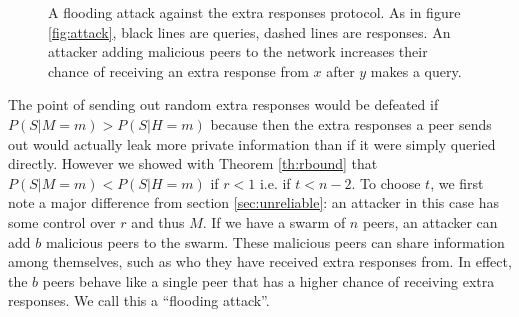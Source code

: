 \documentclass{article}
\newcommand{\secref}[1]{section \ref{sec:#1}}
\newcommand{\thref}[1]{Theorem \ref{th:#1}}
\newcommand{\figref}[1]{figure \ref{fig:#1}}
\begin{document}
\begin{figure}
	\centering
	\caption{A flooding attack against the extra responses protocol. As in \figref{attack},
	black lines are queries, dashed lines are responses. An attacker
	adding malicious peers to the network increases their chance of receiving an
	extra response from $x$ after $y$ makes a query.}
	\label{fig:flood}
\end{figure}

The point of sending out random extra responses would be defeated if
$P(S|M=m)>P(S|H=m)$ because then the extra responses a peer sends out would
actually leak more private information than if it were simply queried directly.
However we showed with \thref{rbound} that $P(S|M=m)<P(S|H=m)$ if $r<1$ i.e. if
$t<n-2$.
To choose $t$, we first note
a major difference from \secref{unreliable}: an attacker in this case
has some control over $r$ and thus $M$. If we have a swarm of $n$ peers,
an attacker can add $b$ malicious peers to the swarm. These malicious peers can
share information among themselves, such as who they have received extra
responses from. In effect, the $b$ peers behave like a single peer that has a
higher chance of receiving extra responses. We call this a ``flooding attack''.
\end{document}
